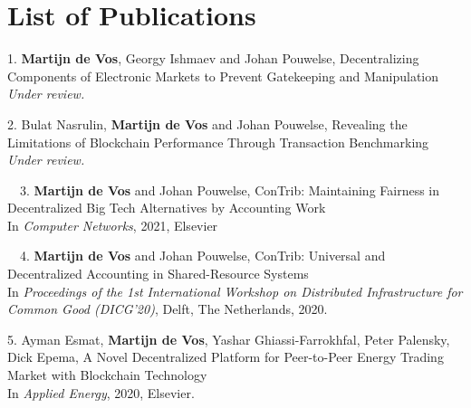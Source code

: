 \chapter*{List of Publications}
\label{publications}

\begin{etaremune}{%
		
\item[1.] \textbf{Martijn de Vos}, Georgy Ishmaev and Johan Pouwelse, Decentralizing Components of Electronic Markets to Prevent Gatekeeping and Manipulation\\
\emph{Under review.}
		
\item[2.] Bulat Nasrulin, \textbf{Martijn de Vos} and Johan Pouwelse, Revealing the Limitations of Blockchain Performance Through Transaction Benchmarking\\
\emph{Under review.}


\item[\faFileTextO~~3.] \textbf{Martijn de Vos} and Johan Pouwelse, ConTrib: Maintaining Fairness in Decentralized Big Tech Alternatives by Accounting Work\\
In \emph{Computer Networks}, 2021, Elsevier

\item[\faFileTextO~~4.] \textbf{Martijn de Vos} and Johan Pouwelse, ConTrib: Universal and Decentralized Accounting in Shared-Resource Systems\\
In \emph{Proceedings of the 1st International Workshop on Distributed Infrastructure for Common Good (DICG'20)}, Delft, The Netherlands, 2020.

\item[5.] Ayman Esmat, \textbf{Martijn de Vos}, Yashar Ghiassi-Farrokhfal, Peter Palensky, Dick Epema, A Novel Decentralized Platform for Peer-to-Peer Energy Trading Market with Blockchain Technology\\
In \emph{Applied Energy}, 2020, Elsevier.

}
\end{etaremune}
